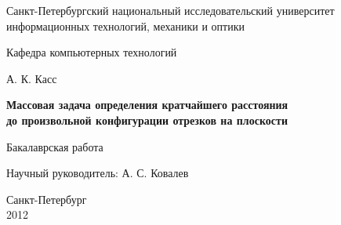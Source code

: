 \documentclass{report}
\theoremstyle{plain}
\theoremstyle{definition}
\numberwithin{theorem}{chapter}        %
\begin{document}


\initializefrontsections

\pagestyle{title}

\begin{center}
Санкт-Петербургский национальный исследовательский университет \\ информационных технологий, механики и оптики

\vspace{2cm}

Кафедра компьютерных технологий

\vspace{3cm}

{\Large А. К. Касс}

\vspace{2cm}

\vbox{\LARGE\bfseries
Массовая задача определения кратчайшего расстояния\\до произвольной
конфигурации отрезков на плоскости}

\vspace{4cm}

Бакалаврская работа 

\vspace{1cm}

{\Large Научный руководитель: А. С. Ковалев}

\vspace{6cm}

Санкт-Петербург\\ 2012
\end{center}

\newpage

\setcounter{page}{2}
\pagestyle{plain}



\tableofcontents


\def\t#1{\mbox{\texttt{\hbox{#1}}}}
\def\b#1{\textbf{#1}}
\def\tb#1{\t{\b{#1}}}

\def\cln#1{\t{#1}}
\def\pcn#1{\t{#1}}
\newcommand{\p}{\par Здесь будет текст...}
\end{document}
